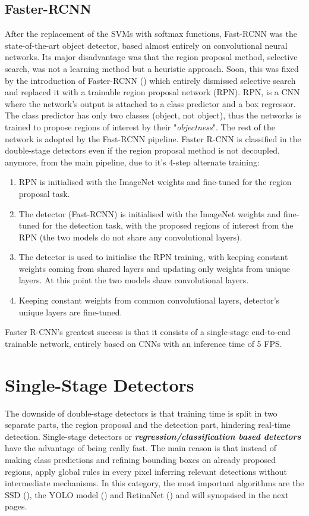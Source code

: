 \subsection{Faster-RCNN}
After the replacement of the SVMs with softmax functions, Fast-RCNN was the state-of-the-art object detector, based almost entirely on convolutional neural networks. Its major disadvantage was that the region proposal method, selective search, was not a learning method but a heuristic approach. Soon, this was fixed by the introduction of Faster-RCNN (\cite{ren2015faster}) which entirely dismissed selective search and replaced it with a trainable region proposal network (RPN). RPN, is a CNN where the network's output is attached to a class predictor and a box regressor. The class predictor has only two classes (object, not object), thus the networks is trained to propose regions of interest by their "\textit{objectness}". The rest of the network is adopted by the Fast-RCNN pipeline. Faster R-CNN is classified in the double-stage detectors even if the region proposal method is not decoupled, anymore, from the main pipeline, due to it's 4-step alternate training:
 
\begin{enumerate}
  \item RPN is initialised with the ImageNet weights and fine-tuned for the region proposal task.
  \item The detector (Fast-RCNN) is initialised with the ImageNet weights and fine-tuned for the detection task, with the proposed regions of interest from the RPN (the two models do not share any convolutional layers).
  \item The detector is used to initialise the RPN training, with keeping constant weights coming from shared layers and updating only weights from unique layers. At this point the two models share convolutional layers.
  \item Keeping constant weights from common convolutional layers, detector's unique layers are fine-tuned. 
\end{enumerate}

Faster R-CNN's greatest success is that it consists of a single-stage end-to-end trainable network, entirely based on CNNs with an inference time of 5 FPS.


\section{Single-Stage Detectors}
The downside of double-stage detectors is that training time is split in two separate parts, the region proposal and the detection part, hindering real-time detection. Single-stage detectors or \textbf{\textit{regression/classification based detectors}} have the advantage of being really fast. The main reason is that instead of making class predictions and refining bounding boxes on already proposed regions, apply global rules in every pixel inferring relevant detections without intermediate mechanisms. In this category, the most important algorithms are the SSD (\cite{liu2016ssd}), the YOLO model (\cite{redmon2016you}) and RetinaNet (\cite{lin2017focal}) and will synopsised in the next pages.
 
